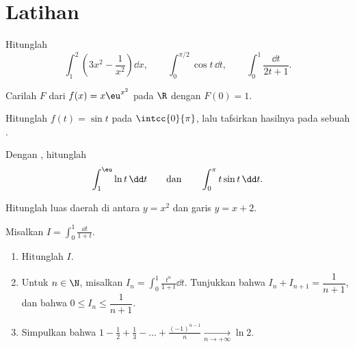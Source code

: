 \section{Latihan}

\begin{exercise}[$\star$]\label{exo:g12:integ:1}
Hitunglah
\[
\int_1^2 \left(3x^2 - \frac{1}{x^2}\right)\dd x, \qquad
\int_0^{\pi/2} \cos t \,\dd t, \qquad
\int_0^{1} \frac{\dd t}{2t+1} .
\]
\end{exercise}

\begin{exercise}[$\star$]\label{exo:g12:integ:2}
Carilah  $F$ dari $f(x) = x\eu^{x^2}$ pada $\R$ dengan $F(0) = 1$.
\end{exercise}

\begin{exercise}[$\star$]\label{exo:g12:integ:3}
Hitunglah  $f(t) = \sin t$ pada $\intcc{0}{\pi}$, lalu
tafsirkan hasilnya pada sebuah .
\end{exercise}

\begin{exercise}[$\star\star$]\label{exo:g12:integ:4}
Dengan , hitunglah
\[
\int_1^{\eu} \ln t\,\dd t
\qquad\text{dan}\qquad
\int_0^{\pi} t \sin t\,\dd t .
\]
\end{exercise}

\begin{exercise}[$\star\star$]\label{exo:g12:integ:5}
Hitunglah luas daerah di antara  $y = x^2$ dan garis
$y = x + 2$.
\end{exercise}

\begin{exercise}[$\star\star$]\label{exo:g12:integ:6}
Misalkan $I = \displaystyle\int_0^1 \frac{\dd t}{1 + t}$.
\begin{enumerate}
  \item Hitunglah $I$.
  \item Untuk $n \in \N$, misalkan $I_n = \displaystyle\int_0^1 \frac{t^n}{1+t}\dd t$.
        Tunjukkan bahwa $I_n + I_{n+1} = \dfrac{1}{n+1}$, dan bahwa
        $0 \leq I_n \leq \dfrac{1}{n+1}$.
  \item Simpulkan bahwa
        $1 - \frac12 + \frac13 - \dots + \frac{(-1)^{n-1}}{n}
        \xrightarrow[n \to +\infty]{} \ln 2$.
\end{enumerate}
\end{exercise}

